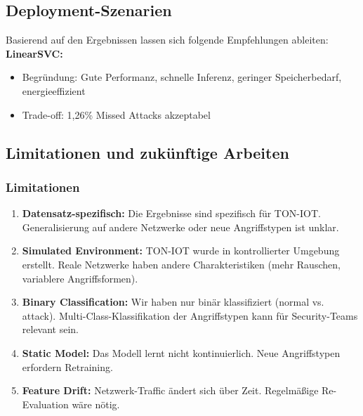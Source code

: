\documentclass[12pt,oneside]{article}
\begin{document}
	\subsection{Deployment-Szenarien}
	Basierend auf den Ergebnissen lassen sich folgende Empfehlungen ableiten:\\
	\textbf{LinearSVC:}
	\begin{itemize}
		\item Begründung: Gute Performanz, schnelle Inferenz, geringer Speicherbedarf, energieeffizient
		\item Trade-off: 1,26\% Missed Attacks akzeptabel
	\end{itemize}
	\subsection{Limitationen und zukünftige Arbeiten}
	\subsubsection{Limitationen}
	\begin{enumerate}
		\item \textbf{Datensatz-spezifisch:} Die Ergebnisse sind spezifisch für TON-IOT. Generalisierung auf andere Netzwerke oder neue Angriffstypen ist unklar.
		\item \textbf{Simulated Environment:} TON-IOT wurde in kontrollierter Umgebung erstellt. Reale Netzwerke haben andere Charakteristiken (mehr Rauschen, variablere Angriffsformen).
		
		\item \textbf{Binary Classification:} Wir haben nur binär klassifiziert (normal vs. attack). Multi-Class-Klassifikation der Angriffstypen kann für Security-Teams relevant sein.
		
		\item \textbf{Static Model:} Das Modell lernt nicht kontinuierlich. Neue Angriffstypen erfordern Retraining.
		
		\item \textbf{Feature Drift:} Netzwerk-Traffic ändert sich über Zeit. Regelmäßige Re-Evaluation wäre nötig.
	\end{enumerate}
\end{document}
